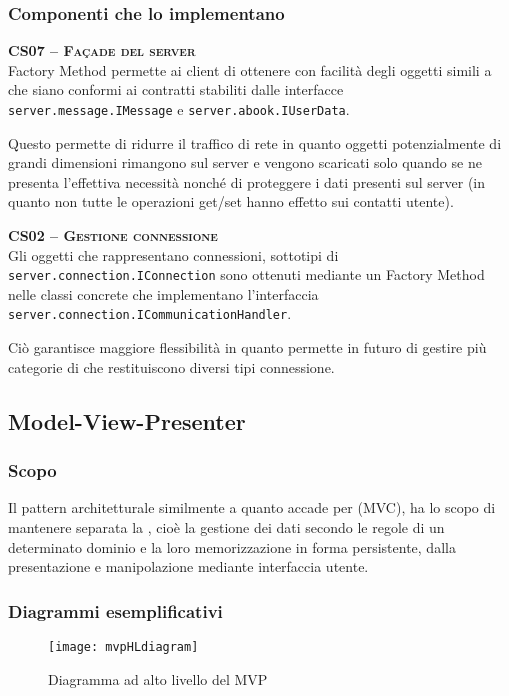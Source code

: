 \subsubsection{Componenti che lo implementano}
\begin{description}
  \item{\scshape\bfseries CS07 -- Façade del server}\\
Factory Method permette ai client di ottenere con facilità degli oggetti simili a  che siano conformi ai contratti stabiliti dalle interfacce \texttt{server.message.IMessage} e \texttt{server.abook.IUserData}.

Questo permette di ridurre il traffico di rete in quanto oggetti potenzialmente di grandi dimensioni rimangono sul server e vengono scaricati solo quando se ne presenta l'effettiva necessità nonché di proteggere i dati presenti sul server (in quanto non tutte le operazioni get/set hanno effetto sui contatti utente).

  \item{\scshape\bfseries CS02 -- Gestione connessione}\\
Gli oggetti che rappresentano connessioni, sottotipi di \texttt{server.connection.IConnection} sono ottenuti mediante un Factory Method nelle classi concrete che implementano l'interfaccia \texttt{server.connection.ICommunicationHandler}.

Ciò garantisce maggiore flessibilità in quanto permette in futuro di gestire più categorie di  che restituiscono diversi tipi connessione.
\end{description}

\subsection{Model-View-Presenter}\label{sec:MVP}

\subsubsection{Scopo}
Il pattern architetturale  similmente a quanto accade per  (MVC), ha lo scopo di mantenere separata la , cioè la gestione dei dati secondo le regole di un determinato dominio e la loro memorizzazione in forma persistente, dalla presentazione e manipolazione mediante interfaccia utente.

\subsubsection{Diagrammi esemplificativi}
\begin{figure}[H]
  \centering
  \texttt{[image: mvpHLdiagram]}
  \caption{Diagramma ad alto livello del  MVP}\label{fig:mvpHL}
\end{figure}


